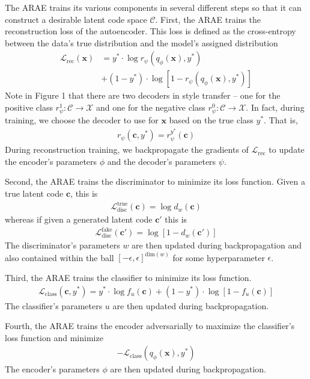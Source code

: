 \documentclass{article}
\newcommand{\vect}[1]{\boldsymbol{#1}}
\begin{document}
The ARAE trains its various components in several different steps so that it can construct a desirable latent code space $\mathcal{C}$.  First, the ARAE trains the reconstruction loss of the autoencoder.  This loss is defined as the cross-entropy between the data's true distribution and the model's assigned distribution 
\begin{align*}
\mathcal{L}_\text{rec}(\vect{x}) &=  y^* \cdot \log r_\psi(q_\phi(\vect{x}), y^*)  \\
&+ (1 - y^*) \cdot  \log \left[1 - r_\psi(q_\phi(\vect{x}), y^*) \right]
\end{align*} 
Note in Figure 1 that there are two decoders in style transfer -- one for the positive class $r_\psi^1: \mathcal{C} \to \mathcal{X}$ and one for the negative class $r_\psi^0 : \mathcal{C} \to \mathcal{X}$.  In fact, during training, we choose the decoder to use for $\vect{x}$ based on the true class $y^*$.  That is, 
\begin{align*}
r_\psi(\vect{c}, y^*) = r_\psi^{y^*}(\vect{c})
\end{align*}    
During reconstruction training, we backpropagate the gradients of $\mathcal{L}_\text{rec}$ to update the encoder's parameters $\phi$ and the decoder's parameters $\psi$.  

Second, the ARAE trains the discriminator to minimize its loss function.
Given a true latent code $\vect{c}$, this is 
\begin{align*}
\mathcal{L}_\text{disc}^\text{true}(\vect{c}) = \log d_w(\vect{c})
\end{align*}
whereas if given a generated latent code $\vect{c'}$ this is
\begin{align*}
\mathcal{L}_\text{disc}^\text{fake}(\vect{c}') = \log \left[1 - d_w(\vect{c}')\right]
\end{align*}
The discriminator's parameters $w$ are then updated during backpropagation and also contained within the ball $[-\epsilon, \epsilon]^{\text{dim}(w)}$ for some hyperparameter $\epsilon$.  

Third, the ARAE trains the classifier to minimize its loss function.
\begin{align*}
\mathcal{L}_\text{class}(\vect{c}, y^*) = y^* \cdot \log f_u(\vect{c}) + (1 - y^*) \cdot \log [1 -  f_u(\vect{c})]
\end{align*} 
The classifier's parameters $u$ are then updated during backpropagation.  

Fourth, the ARAE trains the encoder adversarially to maximize the classifier's loss function and minimize  
\begin{align*}
-\mathcal{L}_\text{class}(q_\phi(\vect{x}), y^*)
\end{align*}
The encoder's parameters $\phi$ are then updated during backpropagation.
\end{document}

